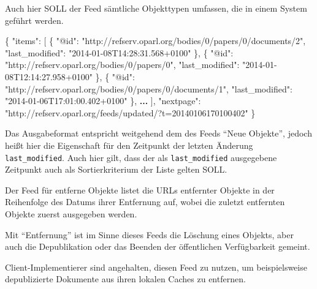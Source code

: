 \documentclass[,a4paper]{article}
\newenvironment{Shaded}{}{}
\newcommand{\DataTypeTok}[1]{\textcolor[rgb]{0.56,0.13,0.00}{{#1}}}
\newcommand{\StringTok}[1]{\textcolor[rgb]{0.25,0.44,0.63}{{#1}}}
\newcommand{\ErrorTok}[1]{\textcolor[rgb]{1.00,0.00,0.00}{\textbf{{#1}}}}
\newcommand{\NormalTok}[1]{{#1}}
\begin{document}
Auch hier SOLL der Feed sämtliche Objekttypen umfassen, die in einem
System geführt werden.

\begin{Shaded}
\begin{Highlighting}[]
\NormalTok{\{}
    \DataTypeTok{"items"}\NormalTok{: [}
        \NormalTok{\{}
            \DataTypeTok{"@id"}\NormalTok{: }\StringTok{"http://refserv.oparl.org/bodies/0/papers/0/documents/2"}\NormalTok{,}
            \DataTypeTok{"last_modified"}\NormalTok{: }\StringTok{"2014-01-08T14:28:31.568+0100"}
        \NormalTok{\},}
        \NormalTok{\{}
            \DataTypeTok{"@id"}\NormalTok{: }\StringTok{"http://refserv.oparl.org/bodies/0/papers/0"}\NormalTok{,}
            \DataTypeTok{"last_modified"}\NormalTok{: }\StringTok{"2014-01-08T12:14:27.958+0100"}
        \NormalTok{\},}
        \NormalTok{\{}
            \DataTypeTok{"@id"}\NormalTok{: }\StringTok{"http://refserv.oparl.org/bodies/0/papers/0/documents/1"}\NormalTok{,}
            \DataTypeTok{"last_modified"}\NormalTok{: }\StringTok{"2014-01-06T17:01:00.402+0100"}
        \NormalTok{\},}
        \ErrorTok{...}
    \NormalTok{],}
    \DataTypeTok{"nextpage"}\NormalTok{: }\StringTok{"http://refserv.oparl.org/feeds/updated/?t=20140106170100402"}
\NormalTok{\}}
\end{Highlighting}
\end{Shaded}

Das Ausgabeformat entspricht weitgehend dem des Feeds ``Neue Objekte'',
jedoch heißt hier die Eigenschaft für den Zeitpunkt der letzten Änderung
\texttt{last\_modified}. Auch hier gilt, dass der als
\texttt{last\_modified} ausgegebene Zeitpunkt auch als Sortierkriterium
der Liste gelten SOLL.


Der Feed für entferne Objekte listet die URLs entfernter Objekte in der
Reihenfolge des Datums ihrer Entfernung auf, wobei die zuletzt
entfernten Objekte zuerst ausgegeben werden.

Mit ``Entfernung'' ist im Sinne dieses Feeds die Löschung eines Objekts,
aber auch die Depublikation oder das Beenden der öffentlichen
Verfügbarkeit gemeint.

Client-Implementierer sind angehalten, diesen Feed zu nutzen, um
beispielsweise depublizierte Dokumente aus ihren lokalen Caches zu
entfernen.
\end{document}
